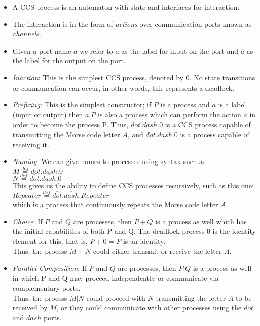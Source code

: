 \documentclass{article}
\begin{document}
\begin{itemize}
\item A CCS process is an automaton with state and interfaces for
interaction.
\item The interaction is in the form of \emph{actions} over
communication ports known as \emph{channels}.
\item Given a port name $a$ we refer to $a$ as the label for input on the port
  and $\overline{a}$ as the label for the output on the port.
\item \emph{Inaction}: This is the simplest CCS process, denoted by
  $0$. No state transitions or communcation can occur, in other words,
  this represents a deadlock.
\item \emph{Prefixing}: This is the simplest constructor; if $P$ is a
  process and $a$ is a label (input or output) then $a.P$ is also a
  process which can perform the action $a$ in order to become the
  process P. Thus, $\overline{dot}.\overline{dash}.0$ is a CCS process capable of
  transmitting the Morse code letter $A$, and
  $dot.dash.0$ is a process capable of receiving
  it.

\item \emph{Naming}: We can give names to processes using syntax such as \\
$ M \overset{def}{=} dot.dash.0$ \\
$ N \overset{def}{=} \overline{dot}.\overline{dash}.0$ \\
This gives us the ability to define CCS processes recursively, such as
this one:\\
$ Repeater \overset{def}{=} \overline{dot}.\overline{dash}.Repeater$\\
which is a process that continuously repeats the Morse code letter $A$.

\item \emph{Choice}: If $P$ and $Q$ are processes, then $P+Q$ is a
  process as well which has the initial capabilities of both P and
  Q. The deadlock process $0$ is the identity element for this, that is,
  $P+0=P$ is an identity.\\
  Thus, the process $M+N$ could either
  transmit or receive the letter $A$.

\item \emph{Parallel Composition}: If $P$ and $Q$ are
  processes, then $P|Q$ is a process as well in which P and Q may
  proceed independently or communicate via complementary ports.\\
  Thus, the process $M|N$ could proceed with $N$ transmitting the
  letter $A$ to be received by $M$, or they could communicate with
  other processes using the $dot$ and $dash$ ports.


\end{itemize}
\end{document}

